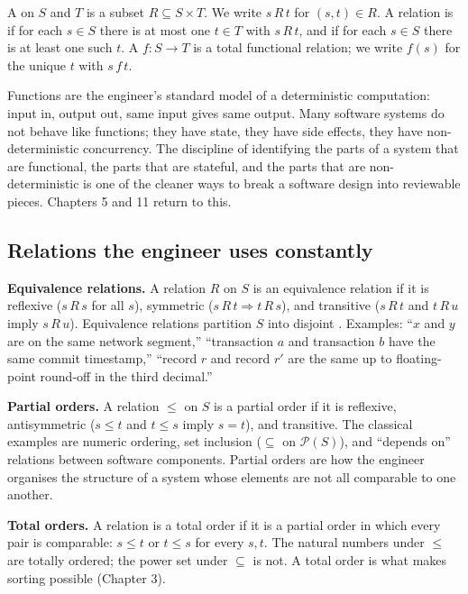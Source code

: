 A  on $S$ and $T$ is a subset $R \subseteq S \times T$. We write $s\, R\, t$ for $(s, t) \in R$. A relation is  if for each $s \in S$ there is at most one $t \in T$ with $s\, R\, t$, and  if for each $s \in S$ there is at least one such $t$. A  $f: S \to T$ is a total functional relation; we write $f(s)$ for the unique $t$ with $s\, f\, t$.

Functions are the engineer's standard model of a deterministic computation: input in, output out, same input gives same output. Many software systems do not behave like functions; they have state, they have side effects, they have non-deterministic concurrency. The discipline of identifying the parts of a system that are functional, the parts that are stateful, and the parts that are non-deterministic is one of the cleaner ways to break a software design into reviewable pieces. Chapters 5 and 11 return to this.

\subsection{Relations the engineer uses constantly}

\textbf{Equivalence relations.} A relation $R$ on $S$ is an equivalence relation if it is reflexive ($s\, R\, s$ for all $s$), symmetric ($s\, R\, t \Rightarrow t\, R\, s$), and transitive ($s\, R\, t$ and $t\, R\, u$ imply $s\, R\, u$). Equivalence relations partition $S$ into disjoint . Examples: ``$x$ and $y$ are on the same network segment,'' ``transaction $a$ and transaction $b$ have the same commit timestamp,'' ``record $r$ and record $r'$ are the same up to floating-point round-off in the third decimal.''

\textbf{Partial orders.} A relation $\leq$ on $S$ is a partial order if it is reflexive, antisymmetric ($s \leq t$ and $t \leq s$ imply $s = t$), and transitive. The classical examples are numeric ordering, set inclusion ($\subseteq$ on $\mathcal{P}(S)$), and ``depends on'' relations between software components. Partial orders are how the engineer organises the structure of a system whose elements are not all comparable to one another.

\textbf{Total orders.} A relation is a total order if it is a partial order in which every pair is comparable: $s \leq t$ or $t \leq s$ for every $s, t$. The natural numbers under $\leq$ are totally ordered; the power set under $\subseteq$ is not. A total order is what makes sorting possible (Chapter 3).


